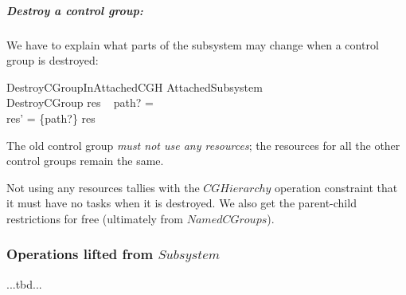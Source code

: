 \documentclass[a4paper,twoside,12pt]{article}
\begin{document}
\subparagraph{Destroy a control group:}
We have to explain what parts of the subsystem may change when a control group is destroyed:

\begin{schema}{DestroyCGroupInAttachedCGH}
\Delta AttachedSubsystem \\
DestroyCGroup
\where
res ~ path? = \emptyset \\
res' = \{path?\} \ndres res 
\end{schema}
The old control group \emph{must not use any resources}; the resources for all the other control groups remain 
the same. 

Not using any resources tallies with the $CGHierarchy$ operation constraint that it must have no tasks when it is
destroyed. We also get the parent-child restrictions for free (ultimately from $NamedCGroups$).

\subsubsection{Operations lifted from $Subsystem$}

...tbd...

\clearpage

\appendix
\end{document}
